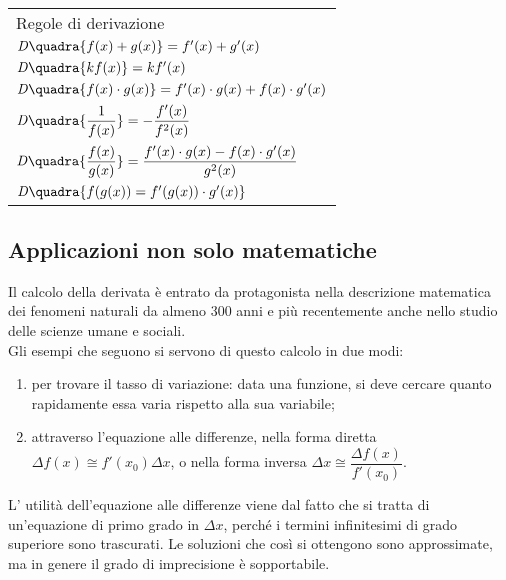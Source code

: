 \begin{center}
\begin{tabular}{l}
\vspace{.5em}  Regole di derivazione\\\vspace{.5em}
$\mathit{D}\quadra{f(x)+g(x)}=f'(x)+g'(x)$\\\vspace{.5em}
$\mathit{D}\quadra{kf(x)}=kf'(x)$\\\vspace{.5em}
$\mathit{D}\quadra{f(x)\cdot g(x)}=f'(x)\cdot g(x)+f(x)\cdot g'(x)$\\\vspace{.5em}
$\mathit{D}\quadra{\dfrac{1}{f(x)}}=-\dfrac{f'(x)}{f^2(x)}$\\\vspace{.5em}
$\mathit{D}\quadra{\dfrac{f(x)}{g(x)}}=\dfrac{f'(x)\cdot g(x)-f(x)
    \cdot g'(x)}{g^2(x)}$\\\vspace{.5em}
$\mathit{D}\quadra{f(g(x))=f'(g(x))\cdot g'(x)}$
\end{tabular}
\end{center}
\label{tab:diff01_regolederivazione}

\subsection{Applicazioni non solo matematiche}
Il calcolo della derivata è entrato da protagonista nella descrizione 
matematica dei fenomeni naturali da almeno $300$ anni e più recentemente
anche nello studio delle scienze umane e sociali. \\
Gli esempi che seguono si servono di questo calcolo in due modi:
\begin{enumerate}[noitemsep]
 \item per trovare il tasso di variazione:
data una funzione, si deve cercare quanto rapidamente essa varia rispetto
alla sua variabile;
 \item attraverso l'equazione alle differenze, 
nella forma diretta $\Delta f(x)\cong f'(x_0)\Delta x$, o nella forma
inversa $\Delta x \cong \dfrac{\Delta f(x)}{f'(x_0)}$.
\end{enumerate}
L' utilità dell'equazione alle differenze viene dal
fatto che si tratta di un'equazione di primo grado in $\Delta x$, perché i 
termini infinitesimi di grado superiore sono trascurati. Le soluzioni che così
si ottengono sono approssimate, ma in genere il grado di imprecisione è 
sopportabile.

